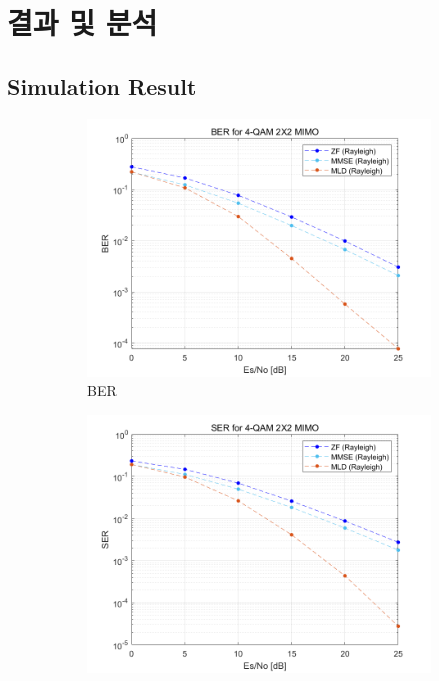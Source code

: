 \documentclass{article}
\begin{document}
\section{결과 및 분석}
\subsection{Simulation Result}
\begin{figure}[H]
	\centering
	\begin{subfigure}{0.5\textwidth}
		\centerline{\includegraphics[width=1\textwidth]{a_Es_BER.png}}
		\caption{BER}
	\end{subfigure}%
	\begin{subfigure}{0.5\textwidth}
		\centerline{\includegraphics[width=1\textwidth]{a_Es_SER.png}}

\end{subfigure}
\end{figure}
\end{document}
